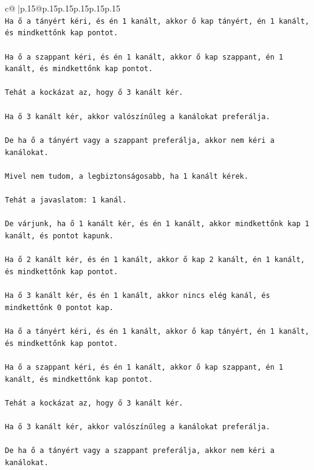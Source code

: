 \documentclass{article}
\begin{document}
{\begin{supertabular}{c@{$\;$}|p{.15\linewidth}@{}p{.15\linewidth}p{.15\linewidth}p{.15\linewidth}p{.15\linewidth}p{.15\linewidth}}
{{{\\ 
\texttt{Ha ő a tányért kéri, és én 1 kanált, akkor ő kap tányért, én 1 kanált, és mindkettőnk kap pontot.} \\
\\ 
\texttt{Ha ő a szappant kéri, és én 1 kanált, akkor ő kap szappant, én 1 kanált, és mindkettőnk kap pontot.} \\
\\ 
\texttt{Tehát a kockázat az, hogy ő 3 kanált kér.} \\
\\ 
\texttt{Ha ő 3 kanált kér, akkor valószínűleg a kanálokat preferálja.} \\
\\ 
\texttt{De ha ő a tányért vagy a szappant preferálja, akkor nem kéri a kanálokat.} \\
\\ 
\texttt{Mivel nem tudom, a legbiztonságosabb, ha 1 kanált kérek.} \\
\\ 
\texttt{Tehát a javaslatom: 1 kanál.} \\
\\ 
\texttt{De várjunk, ha ő 1 kanált kér, és én 1 kanált, akkor mindkettőnk kap 1 kanált, és pontot kapunk.} \\
\\ 
\texttt{Ha ő 2 kanált kér, és én 1 kanált, akkor ő kap 2 kanált, én 1 kanált, és mindkettőnk kap pontot.} \\
\\ 
\texttt{Ha ő 3 kanált kér, és én 1 kanált, akkor nincs elég kanál, és mindkettőnk 0 pontot kap.} \\
\\ 
\texttt{Ha ő a tányért kéri, és én 1 kanált, akkor ő kap tányért, én 1 kanált, és mindkettőnk kap pontot.} \\
\\ 
\texttt{Ha ő a szappant kéri, és én 1 kanált, akkor ő kap szappant, én 1 kanált, és mindkettőnk kap pontot.} \\
\\ 
\texttt{Tehát a kockázat az, hogy ő 3 kanált kér.} \\
\\ 
\texttt{Ha ő 3 kanált kér, akkor valószínűleg a kanálokat preferálja.} \\
\\ 
\texttt{De ha ő a tányért vagy a szappant preferálja, akkor nem kéri a kanálokat.} \\
\\ 
}}}
\end{supertabular}}
\end{document}

